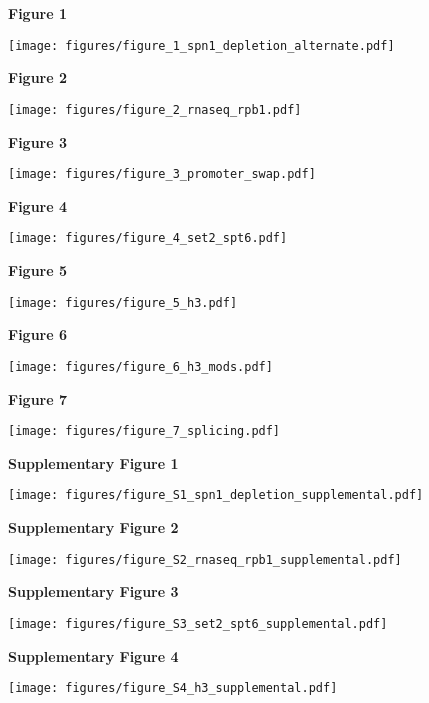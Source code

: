\documentclass[9pt]{extarticle}
\begin{document}
\textbf{\large Figure 1}

\texttt{[image: figures/figure\_1\_spn1\_depletion\_alternate.pdf]}

\newpage

\textbf{\large Figure 2}

\texttt{[image: figures/figure\_2\_rnaseq\_rpb1.pdf]}

\newpage

\textbf{\large Figure 3}

\texttt{[image: figures/figure\_3\_promoter\_swap.pdf]}

\newpage

\textbf{\large Figure 4}

\texttt{[image: figures/figure\_4\_set2\_spt6.pdf]}

\newpage

\textbf{\large Figure 5}

\texttt{[image: figures/figure\_5\_h3.pdf]}

\newpage

\textbf{\large Figure 6}

\texttt{[image: figures/figure\_6\_h3\_mods.pdf]}

\newpage

\textbf{\large Figure 7}

\texttt{[image: figures/figure\_7\_splicing.pdf]}

\newpage

\textbf{\large Supplementary Figure 1}

{\texttt{[image: figures/figure\_S1\_spn1\_depletion\_supplemental.pdf]}\par}

\newpage

\textbf{\large Supplementary Figure 2}

{\texttt{[image: figures/figure\_S2\_rnaseq\_rpb1\_supplemental.pdf]}\par}

\newpage

\textbf{\large Supplementary Figure 3}

{\texttt{[image: figures/figure\_S3\_set2\_spt6\_supplemental.pdf]}\par}

\newpage

\textbf{\large Supplementary Figure 4}

{\texttt{[image: figures/figure\_S4\_h3\_supplemental.pdf]}\par}
\end{document}

